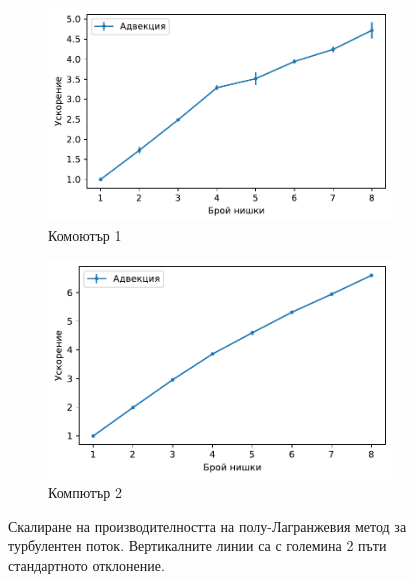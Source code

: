 \documentclass[12pt]{report}
\begin{document}
\begin{figure}[H]
  \centering
  \begin{subfigure}[b]{0.49\textwidth}
      \centering
      \includegraphics[width=\textwidth]{Figures/BG/TurbulentAdvectionSpeedUpC1.pdf}
      \caption{Комоютър 1}
  \end{subfigure}
  \begin{subfigure}[b]{0.49\textwidth}
      \centering
      \includegraphics[width=\textwidth]{Figures/BG/TurbulentAdvectionSpeedUpC2.pdf}
      \caption{Компютър 2}
  \end{subfigure}
\caption{Скалиране на производителността на полу-Лагранжевия метод за турбулентен поток. Вертикалните линии са с големина 2 пъти стандартното отклонение.}\label{fig:advection_speedup_graph_turbulent}
\end{figure}
\end{document}
